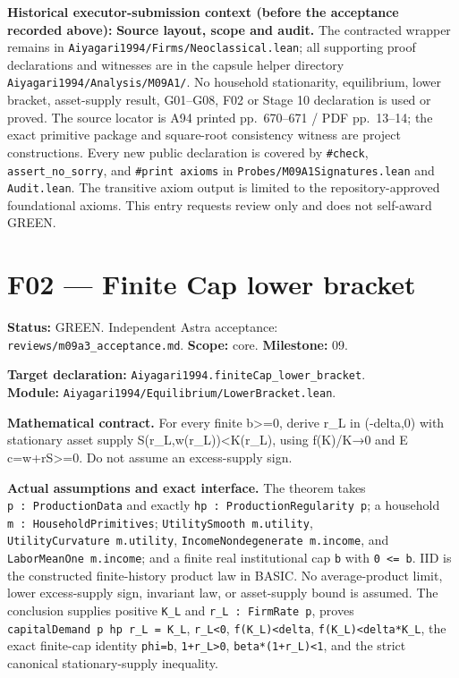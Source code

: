 \documentclass[
  11pt,
]{article}
\let\LedgerOriginalTexttt\texttt
\renewcommand{\texttt}[1]{{\small\LedgerOriginalTexttt{#1}}}
\begin{document}
\textbf{Historical executor-submission context (before the acceptance
recorded above):} \textbf{Source layout, scope and audit.} The
contracted wrapper remains in
\texttt{Aiyagari1994/Firms/Neoclassical.lean}; all supporting proof
declarations and witnesses are in the capsule helper directory
\texttt{Aiyagari1994/Analysis/M09A1/}. No household stationarity,
equilibrium, lower bracket, asset-supply result, G01--G08, F02 or Stage
10 declaration is used or proved. The source locator is A94 printed
pp.~670--671 / PDF pp.~13--14; the exact primitive package and
square-root consistency witness are project constructions. Every new
public declaration is covered by \texttt{\#check},
\texttt{assert\_no\_sorry}, and \texttt{\#print\ axioms} in
\texttt{Probes/M09A1Signatures.lean} and \texttt{Audit.lean}. The
transitive axiom output is limited to the repository-approved
foundational axioms. This entry requests review only and does not
self-award GREEN.

\section{F02 --- Finite Cap lower
bracket}\label{f02-finite-cap-lower-bracket}

\textbf{Status:} GREEN. Independent Astra acceptance:
\texttt{reviews/m09a3\_acceptance.md}. \textbf{Scope:} core.
\textbf{Milestone:} 09.

\textbf{Target declaration:}
\texttt{Aiyagari1994.finiteCap\_lower\_bracket}.\\
\textbf{Module:} \texttt{Aiyagari1994/Equilibrium/LowerBracket.lean}.

\textbf{Mathematical contract.} For every finite b\textgreater=0, derive
r\_L in (-delta,0) with stationary asset supply
S(r\_L,w(r\_L))\textless K(r\_L), using f(K)/K→0 and E
c=w+rS\textgreater=0. Do not assume an excess-supply sign.

\textbf{Actual assumptions and exact interface.} The theorem takes
\texttt{p\ :\ ProductionData} and exactly
\texttt{hp\ :\ ProductionRegularity\ p}; a household
\texttt{m\ :\ HouseholdPrimitives}; \texttt{UtilitySmooth\ m.utility},
\texttt{UtilityCurvature\ m.utility},
\texttt{IncomeNondegenerate\ m.income}, and
\texttt{LaborMeanOne\ m.income}; and a finite real institutional cap
\texttt{b} with \texttt{0\ \textless{}=\ b}. IID is the constructed
finite-history product law in BASIC. No average-product limit, lower
excess-supply sign, invariant law, or asset-supply bound is assumed. The
conclusion supplies positive \texttt{K\_L} and
\texttt{r\_L\ :\ FirmRate\ p}, proves
\texttt{capitalDemand\ p\ hp\ r\_L\ =\ K\_L}, \texttt{r\_L\textless{}0},
\texttt{f\textquotesingle{}(K\_L)\textless{}delta},
\texttt{f(K\_L)\textless{}delta*K\_L}, the exact finite-cap identity
\texttt{phi=b}, \texttt{1+r\_L\textgreater{}0},
\texttt{beta*(1+r\_L)\textless{}1}, and the strict canonical
stationary-supply inequality.
\end{document}
